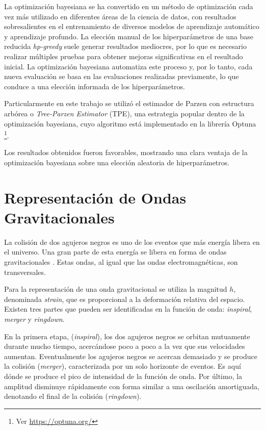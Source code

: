 La optimización bayesiana \cite{7352306, https://doi.org/10.48550/arxiv.1012.2599} se ha convertido en un método de optimización cada vez más utilizado en diferentes áreas de la ciencia de datos, con resultados sobresalientes en el entrenamiento de diversos modelos de aprendizaje automático y aprendizaje profundo. La elección manual de los hiperparámetros de una base reducida \textit{hp-greedy} suele generar resultados mediocres, por lo que es necesario realizar múltiples pruebas para obtener mejoras significativas en el resultado inicial. La optimización bayesiana automatiza este proceso y, por lo tanto, cada nueva evaluación se basa en las evaluaciones realizadas previamente, lo que conduce a una elección informada de los hiperparámetros. 

Particularmente en este trabajo se utilizó el estimador de Parzen con estructura arbórea o \textit{Tree-Parzen Estimator} (TPE), una estrategia popular dentro de la optimización bayesiana, cuyo algoritmo está implementado en la librería Optuna \cite{optuna_2019} \footnote{Ver \url{https://optuna.org/}}. 


Los resultados obtenidos fueron favorables, mostrando una clara ventaja de la optimización bayesiana sobre una elección aleatoria de hiperparámetros.











\section{Representación de Ondas Gravitacionales}

La colisión de dos agujeros negros es uno de los eventos que más energía libera en el universo. Una gran parte de esta energía se libera en forma de ondas gravitacionales \cite{Centrella_2010}. Estas ondas, al igual que las ondas electromagnéticas, son transversales.

Para la representación de una onda gravitacional se utiliza la magnitud $h$, denominada \textit{strain}, que es proporcional a la deformación relativa del espacio. Existen tres partes que pueden ser identificadas en la función de onda: \textit{inspiral}, \textit{merger} y \textit{ringdown}. 

En la primera etapa, (\textit{inspiral}), los dos agujeros negros se orbitan mutuamente durante mucho tiempo, acercándose poco a poco a la vez que sus velocidades aumentan. Eventualmente los agujeros negros se acercan demasiado y se produce la colisión (\textit{merger}), caracterizada por un solo horizonte de eventos. Es aquí dónde se produce el pico de intensidad de la función de onda. Por último, la amplitud disminuye rápidamente con forma similar a una oscilación amortiguada, denotando el final de la colisión (\textit{ringdown}).

